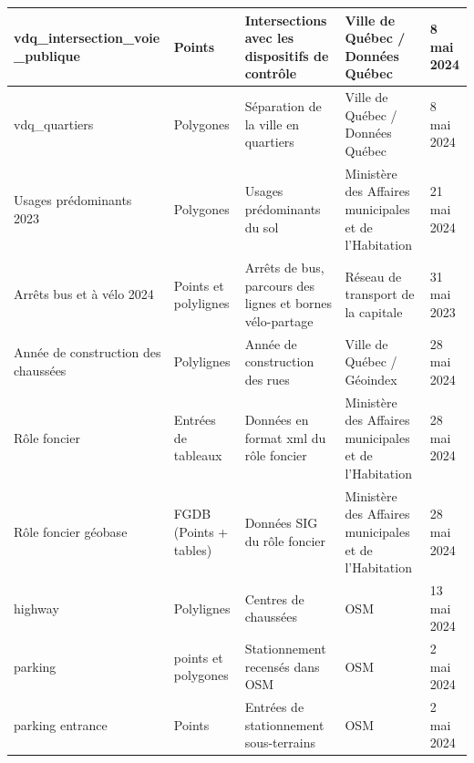 \begin{landscape}
\begin{longtable}[h!]{p{.2 \linewidth} p{.1 \linewidth} p{.3 \linewidth} p{.15\linewidth} p{.125\linewidth} }
        \hline
        vdq\_intersection\_voie \_publique & Points & Intersections avec les dispositifs de contrôle & Ville de Québec / Données Québec & 8 mai 2024 \\
        \hline
        vdq\_quartiers & Polygones &Séparation de la ville en quartiers & Ville de Québec / Données Québec & 8 mai 2024\\
        \hline
        Usages prédominants 2023  & Polygones & Usages prédominants du sol &   Ministère des Affaires municipales et de l'Habitation & 21 mai 2024 \\
        \hline
        Arrêts bus et à vélo 2024 & Points et polylignes & Arrêts de bus, parcours des lignes et bornes vélo-partage & Réseau de transport de la capitale & 31 mai 2023 \\
        \hline
        Année de construction des chaussées & Polylignes & Année de construction des rues & Ville de Québec / Géoindex & 28 mai 2024 \\
        \hline
        Rôle foncier & Entrées de tableaux & Données en format xml du rôle foncier & Ministère des Affaires municipales et de l'Habitation & 28 mai 2024 \\
        \hline
        Rôle foncier géobase & FGDB (Points + tables) & Données SIG du rôle foncier & Ministère des Affaires municipales et de l'Habitation & 28 mai 2024 \\
        \hline
        highway & Polylignes & Centres de chaussées & \ac{OSM} & 13 mai 2024\\
        \hline
        parking & points et polygones & Stationnement recensés dans \ac{OSM} & \ac{OSM} & 2 mai 2024 \\
        \hline
          parking entrance & Points & Entrées de stationnement sous-terrains  & \ac{OSM} & 2 mai 2024 \\
          \hline
        
      \end{longtable}


\end{landscape}
